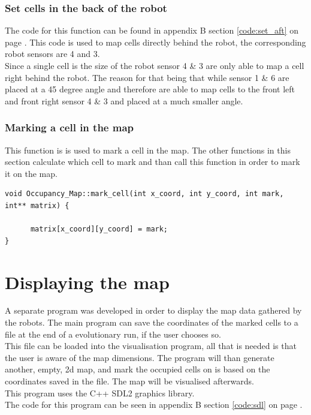 \subsubsection{Set cells in the back of the robot}
The code for this function can be found in appendix B section \ref{code:set_aft} on page \pageref{code:set_aft}. 
This code is used to map cells directly behind the robot, the corresponding robot sensors are 4 and 3. \\
Since a single cell is the size of the robot sensor 4 \& 3 are only able to map a cell right behind the robot. The reason for that being that while sensor 1 \& 6 are placed at a 45 degree angle and therefore are able to map cells to the front left and front right sensor 4 \& 3 and placed at a much smaller angle. 

\subsubsection{Marking a cell in the map}
This function is is used to mark a cell in the map. The other functions in this section calculate which cell to mark and than call this function in order to mark it on the map.

\begin{lstlisting}[caption = {Mark a cell on the map}]
void Occupancy_Map::mark_cell(int x_coord, int y_coord, int mark, int** matrix) {

      matrix[x_coord][y_coord] = mark;
}
\end{lstlisting}

\section{Displaying the map}
\label{chap3:sdl}
A separate program was developed in order to display the map data gathered by the robots. The main program can save the coordinates of the marked cells to a file at the end of a evolutionary run, if the user chooses so. \\
This file can be loaded into the visualisation program, all that is needed is that the user is aware of the map dimensions. 
The program will than generate another, empty, 2d map, and mark the occupied cells on is based on the coordinates saved in the file. 
The map will be visualised afterwards.\\
This program uses the C++ SDL2 graphics library. \\
The code for this program can be seen in appendix B section \ref{code:sdl} on page \pageref{code:sdl}.\\

